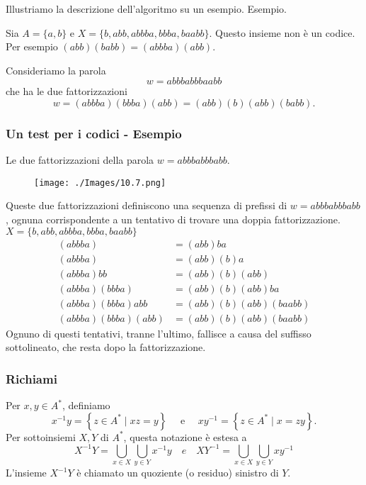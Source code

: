\vspace{5mm}

Illustriamo la descrizione dell'algoritmo su un esempio.
Esempio.

Sia $A=\{a, b\}$ e $X=\{b, a b b, a b b b a, b b b a, b a a b b\} .$
Questo insieme non è un codice. Per esempio $(a b b)(b a b b)=(a b b b a)(a b b)$.

Consideriamo la parola
$$
w=a b b b a b b b a a b b
$$
che ha le due fattorizzazioni
$$
w=(a b b b a)(b b b a)(a b b)=(a b b)(b)(a b b)(b a b b) .
$$

\subsubsection{Un test per i codici - Esempio}

Le due fattorizzazioni della parola $w=a b b b a b b b a b b$.

\begin{figure}[hbpt!]
    \centering
    \texttt{[image: ./Images/10.7.png]}
\end{figure}
\FloatBarrier

Queste due fattorizzazioni definiscono una sequenza di prefissi di $w=a b b b a b b b a b b$, ognuna corrispondente a un tentativo di trovare una doppia fattorizzazione.
$X=\{b, a b b, a b b b a, b b b a, b a a b b\}$
$$
\begin{array}{rc}
(a b b b a) & =(a b b) b a \\
(a b b b a) & =(a b b)(b) a \\
(a b b b a) b b & =(a b b)(b)(a b b) \\
(a b b b a)(b b b a) & =(a b b)(b)(a b b) b a \\
(a b b b a)(b b b a) a b b & =(a b b)(b)(a b b)(b a a b b) \\
(a b b b a)(b b b a)(a b b) & =(a b b)(b)(a b b)(b a a b b)
\end{array}
$$
Ognuno di questi tentativi, tranne l'ultimo, fallisce a causa del suffisso sottolineato, che resta dopo la fattorizzazione.

\subsubsection{Richiami}

Per $x, y \in A^{*}$, definiamo
$$
x^{-1} y=\left\{z \in A^{*} \mid x z=y\right\} \quad \text { e } \quad x y^{-1}=\left\{z \in A^{*} \mid x=z y\right\} .
$$
Per sottoinsiemi $X, Y$ di $A^{*}$, questa notazione è estesa a
$$
X^{-1} Y=\bigcup_{x \in X} \bigcup_{y \in Y} x^{-1} y \quad e \quad X Y^{-1}=\bigcup_{x \in X} \bigcup_{y \in Y} x y^{-1}
$$
L'insieme $X^{-1} Y$ è chiamato un quoziente (o residuo) sinistro di $Y$.

